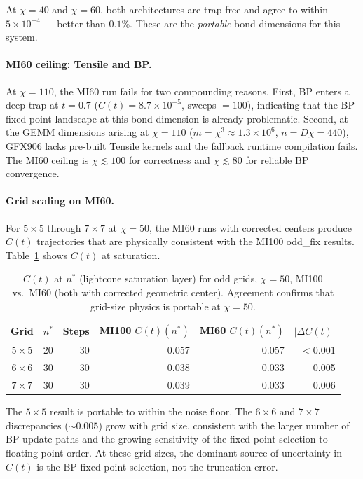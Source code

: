 \documentclass[11pt]{article}
\newcommand{\Ct}{C(t)}
\begin{document}
At $\chi=40$ and $\chi=60$, both architectures are trap-free and agree
to within $5\times10^{-4}$ --- better than $0.1\%$.
These are the \emph{portable} bond dimensions for this system.

\paragraph{MI60 ceiling: Tensile and BP.}
At $\chi=110$, the MI60 run fails for two compounding reasons.
First, BP enters a deep trap at $t=0.7$ ($\Ct = 8.7\times10^{-5}$,
sweeps $= 100$), indicating that the BP fixed-point landscape at this
bond dimension is already problematic.
Second, at the GEMM dimensions arising at $\chi=110$
($m = \chi^3 \approx 1.3\times10^6$, $n = D\chi = 440$),
GFX906 lacks pre-built Tensile kernels and the fallback
runtime compilation fails.
The MI60 ceiling is $\chi \lesssim 100$ for correctness and
$\chi \lesssim 80$ for reliable BP convergence.

\paragraph{Grid scaling on MI60.}
For $5\times5$ through $7\times7$ at $\chi=50$, the MI60 runs with corrected
centers produce $\Ct$ trajectories that are physically consistent with the
MI100 odd\_fix results.
Table~\ref{tab:mi60_grids} shows $\Ct$ at saturation.

\begin{table}[ht]
\centering
\caption{$\Ct$ at $n^*$ (lightcone saturation layer) for odd grids,
  $\chi=50$, MI100 vs.\ MI60 (both with corrected geometric center).
  Agreement confirms that grid-size physics is portable at $\chi=50$.}
\label{tab:mi60_grids}
\begin{tabular}{ccrrrr}
\toprule
Grid & $n^*$ & Steps & MI100 $\Ct(n^*)$ & MI60 $\Ct(n^*)$ & $|\Delta\Ct|$ \\
\midrule
$5\times5$ & 20 & 30 & 0.057 & 0.057 & $<0.001$ \\
$6\times6$ & 30 & 30 & 0.038 & 0.033 & 0.005    \\
$7\times7$ & 30 & 30 & 0.039 & 0.033 & 0.006    \\
\bottomrule
\end{tabular}
\end{table}

The $5\times5$ result is portable to within the noise floor.
The $6\times6$ and $7\times7$ discrepancies ($\sim 0.005$) grow with
grid size, consistent with the larger number of BP update paths and the
growing sensitivity of the fixed-point selection to floating-point order.
At these grid sizes, the dominant source of uncertainty in $\Ct$ is the
BP fixed-point selection, not the truncation error.
\end{document}
